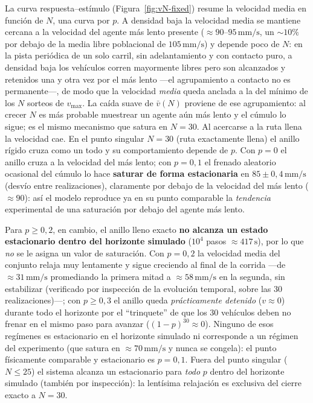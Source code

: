 \documentclass[11pt,a4paper]{article}
\newcommand{\unit}[1]{\,\mathrm{#1}}
\begin{document}
La curva respuesta--estímulo (Figura~\ref{fig:vN-fixed}) resume la velocidad media en
función de $N$, una curva por $p$. A densidad baja la velocidad media se mantiene
cercana a la velocidad del agente más lento presente ($\approx90$--$95\unit{mm/s}$, un
$\sim10\%$ por debajo de la media libre poblacional de $105\unit{mm/s}$) y depende poco
de $N$: en la pista periódica de un solo carril, sin adelantamiento y con contacto puro,
a densidad baja los vehículos corren mayormente libres pero son alcanzados y retenidos una y
otra vez por el más lento —el agrupamiento a contacto no es permanente—, de modo que la
velocidad \emph{media} queda anclada a la del mínimo de los $N$ sorteos de $v_{\max}$. La caída suave de
$\bar v(N)$ proviene de ese agrupamiento: al crecer $N$ es más probable muestrear un
agente aún más lento y el cúmulo lo sigue; es el mismo mecanismo que satura en $N=30$. Al
acercarse a la ruta llena la velocidad cae. En el punto singular $N=30$ (ruta exactamente
llena) el anillo rígido cruza como un todo y su comportamiento depende de $p$. Con $p=0$ el
anillo cruza a la velocidad del más lento; con $p=0{,}1$ el frenado aleatorio ocasional del
cúmulo lo hace \textbf{saturar de forma estacionaria} en $85\pm0{,}4\unit{mm/s}$ (desvío entre
realizaciones), claramente por debajo de la velocidad del más lento ($\approx90$): así el modelo
reproduce ya en su punto comparable la
\emph{tendencia} experimental de una saturación por debajo del agente más lento.

Para $p\ge0{,}2$, en cambio, el anillo lleno exacto \textbf{no alcanza un estado estacionario
dentro del horizonte simulado} ($10^4$ pasos $\approx417\unit{s}$), por lo que \emph{no} se le
asigna un valor de saturación. Con $p=0{,}2$ la velocidad media del conjunto relaja muy
lentamente y sigue creciendo al final de la corrida —de $\approx31\unit{mm/s}$ promediando la
primera mitad a $\approx58\unit{mm/s}$ en la segunda, sin estabilizar (verificado por
inspección de la evolución temporal, sobre las $30$ realizaciones)—; con $p\ge0{,}3$ el anillo
queda \emph{prácticamente detenido} ($v\approx0$) durante todo el horizonte por el ``trinquete''
de que los $30$ vehículos deben no frenar en el mismo paso para avanzar ($(1-p)^{30}\approx0$).
Ninguno de esos regímenes es estacionario en el horizonte simulado ni corresponde a un régimen
del experimento (que satura en $\approx70\unit{mm/s}$ y nunca se congela): el punto físicamente
comparable y estacionario es $p=0{,}1$. Fuera del punto singular ($N\le25$) el sistema alcanza
un estacionario para \emph{todo} $p$ dentro del horizonte simulado (también por inspección): la
lentísima relajación es exclusiva del cierre exacto a $N=30$.
\end{document}
